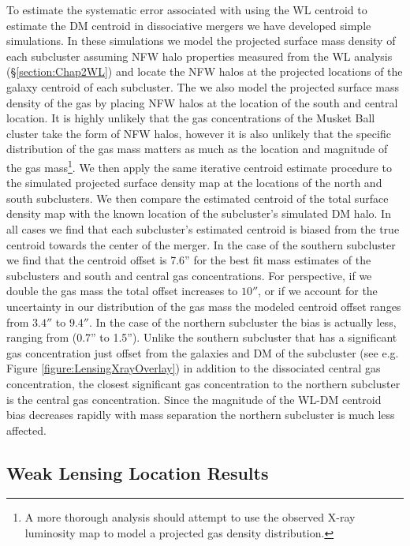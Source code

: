 To estimate the systematic error associated with using the WL centroid to estimate the DM centroid in dissociative mergers we have developed simple simulations.
In these simulations we model the projected surface mass density of each subcluster assuming NFW halo properties measured from the WL analysis (\S\ref{section:Chap2WL}) and locate the NFW halos at the projected locations of the galaxy centroid of each subcluster.
The we also model the projected surface mass density of the gas by placing NFW halos at the location of the south and central location.
It is highly unlikely that the gas concentrations of the Musket Ball cluster take the form of NFW halos, however it is also unlikely that the specific distribution of the gas mass matters as much as the location and magnitude of the gas mass\footnote{A more thorough analysis should attempt to use the observed X-ray luminosity map to model a projected gas density distribution.}.
We then apply the same iterative centroid estimate procedure to the simulated projected surface density map at the locations of the north and south subclusters.
We then compare the estimated centroid of the total surface density map with the known location of the subcluster's simulated DM halo.
In all cases we find that each subcluster's estimated centroid is biased from the true centroid towards the center of the merger.
In the case of the southern subcluster we find that the centroid offset is 7.6'' for the best fit mass estimates of the subclusters and south and central gas concentrations.
For perspective, if we double the gas mass the total offset increases to $10''$, or if we account for the uncertainty in our distribution of the gas mass the modeled centroid offset ranges from $3.4''$ to $9.4''$.
In the case of the northern subcluster the bias is actually less, ranging from (0.7'' to 1.5'').
Unlike the southern subcluster that has a significant gas concentration just offset from the galaxies and DM of the subcluster (see e.g. Figure \ref{figure:LensingXrayOverlay}) in addition to the dissociated central gas concentration, the closest significant gas concentration to the northern subcluster is the central gas concentration.
Since the magnitude of the WL-DM centroid bias decreases rapidly with mass separation the northern subcluster is much less affected.

\subsection{Weak Lensing Location Results}

